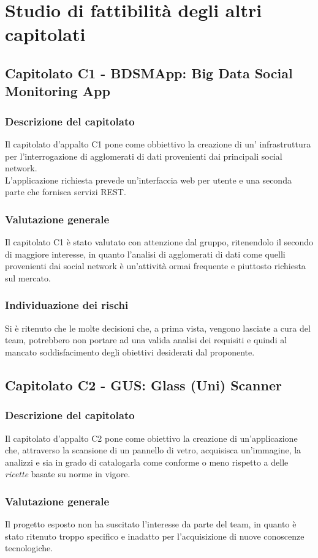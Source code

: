 \section{Studio di fattibilità degli altri capitolati}
	\subsection{Capitolato C1 - BDSMApp: Big Data Social Monitoring App}
		\subsubsection{Descrizione del capitolato}
			Il capitolato d'appalto C1 pone come obbiettivo la creazione di un' infrastruttura per l'interrogazione di agglomerati di dati provenienti dai principali social network.\\
			L'applicazione richiesta prevede un'interfaccia web per utente e una seconda parte che fornisca servizi REST.
		\subsubsection{Valutazione generale}
			Il capitolato C1 è stato valutato con attenzione dal gruppo, ritenendolo il secondo di maggiore interesse, in quanto l'analisi di agglomerati di dati come quelli provenienti dai social network è un'attività ormai frequente e piuttosto richiesta sul mercato.
		\subsubsection{Individuazione dei rischi}
			Si è ritenuto che le molte decisioni che, a prima vista, vengono lasciate a cura del team, potrebbero non portare ad una valida analisi dei requisiti e quindi al mancato soddisfacimento degli obiettivi desiderati dal proponente.
	\subsection{Capitolato C2 - GUS: Glass (Uni) Scanner}
		\subsubsection{Descrizione del capitolato}
			Il capitolato d'appalto C2 pone come obiettivo la creazione di un'applicazione che, attraverso la scansione di un pannello di vetro, acquisisca un'immagine, la analizzi e sia in grado di catalogarla come conforme o meno rispetto a delle \textit{ricette} basate su norme in vigore.
		\subsubsection{Valutazione generale}
			Il progetto esposto non ha suscitato l'interesse da parte del team, in quanto è stato ritenuto troppo specifico e inadatto per l'acquisizione di nuove conoscenze tecnologiche.
